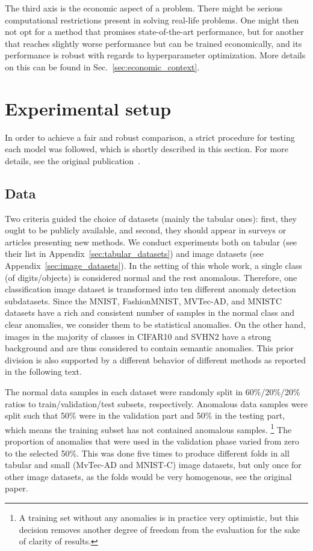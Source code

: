 The third axis is the economic aspect of a problem. There might be serious computational restrictions present in solving real-life problems. One might then not opt for a method that promises state-of-the-art performance, but for another that reaches slightly worse performance but can be trained economically, and its performance is robust with regards to hyperparameter optimization. More details on this can be found in Sec.~\ref{sec:economic_context}.

\section{Experimental setup}
\label{sec:experimentalsetup}

In order to achieve a fair and robust comparison, a strict procedure for testing each model was followed, which is shortly described in this section. For more details, see the original publication~\cite{vskvara2021comparison}.

\subsection{Data}

Two criteria guided the choice of datasets (mainly the tabular ones): first, they ought to be publicly available, and second, they should appear in surveys or articles presenting new methods. We conduct experiments both on tabular (see their list in Appendix~\ref{sec:tabular_datasets}) and image datasets (see Appendix~\ref{sec:image_datasets}). In the setting of this whole work, a single class (of digits/objects) is considered normal and the rest anomalous. Therefore, one classification image dataset is transformed into ten different anomaly detection subdatasets. Since the MNIST, FashionMNIST, MVTec-AD, and MNISTC datasets have a rich and consistent number of samples in the normal class and clear anomalies, we consider them to be statistical anomalies. On the other hand, images in the majority of classes in CIFAR10 and SVHN2 have a strong background and are thus considered to contain semantic anomalies. This prior division is also supported by a different behavior of different methods as reported in the following text.

The normal data samples in each dataset were randomly split in 60\%/20\%/20\% ratios to train/validation/test subsets, respectively. Anomalous data samples were split such that 50\% were in the validation part and 50\% in the testing part, which means the training subset has not contained anomalous samples. \footnote{A training set without any anomalies is in practice very optimistic, but this decision removes another degree of freedom from the evaluation for the sake of clarity of results.} The proportion of anomalies that were used in the validation phase varied from zero to the selected 50\%. This was done five times to produce different folds in all tabular and small (MvTec-AD and MNIST-C) image datasets, but only once for other image datasets, as the folds would be very homogenous, see the original paper.

